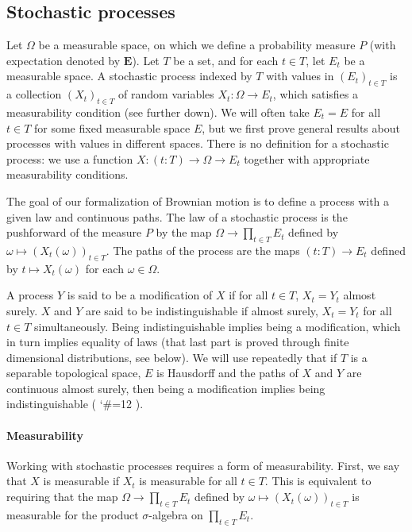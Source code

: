 \documentclass[lean]{Draft}
\makeatletter
\newcommand\leanlink{\begingroup\catcode`\#=12\relax\@leanlink}
\newcommand\@leanlink[2]{\endgroup
\href{#1}
{\texttt{\detokenize{#2}}}}
\newcommand{\bmlink}[3]{%
\leanlink{https://github.com/RemyDegenne/brownian-motion/blob/8fd8dc52830cdd07cf9cc8eadd533e284425fa6f/BrownianMotion/#1.lean\##2}
{#3}}
\makeatother
\begin{document}
\subsection{Stochastic processes}\label{S:stochastic_processes}

Let $\Omega$ be a measurable space, on which we define a probability measure $P$ (with expectation denoted by $\mathbf{E}$).
Let $T$ be a set, and for each $t \in T$, let $E_t$ be a measurable space.
A stochastic process indexed by $T$ with values in $(E_t)_{t \in T}$ is a collection $(X_t)_{t \in T}$ of random variables $X_t : \Omega \to E_t$, which satisfies a measurability condition (see further down).
We will often take $E_t = E$ for all $t \in T$ for some fixed measurable space $E$, but we first prove general results about processes with values in different spaces.
There is no \Lean definition for a stochastic process: we use a function $X : (t : T) \to \Omega \to E_t$ together with appropriate measurability conditions.

The goal of our formalization of Brownian motion is to define a process with a given law and continuous paths.
The law of a stochastic process is the pushforward of the measure $P$ by the map $\Omega \to \prod_{t \in T} E_t$ defined by $\omega \mapsto (X_t(\omega))_{t \in T}$.
The paths of the process are the maps $(t : T) \to E_t$ defined by $t \mapsto X_t(\omega)$ for each $\omega \in \Omega$.%

A process $Y$ is said to be a modification of $X$ if for all $t \in T$, $X_t = Y_t$ almost surely.
$X$ and $Y$ are said to be indistinguishable if almost surely, $X_t = Y_t$ for all $t \in T$ simultaneously.
Being indistinguishable implies being a modification, which in turn implies equality of laws (that last part is proved through finite dimensional distributions, see below).
We will use repeatedly that if $T$ is a separable topological space, $E$ is Hausdorff and the paths of $X$ and $Y$ are continuous almost surely, then being a modification implies being indistinguishable (\bmlink{Gaussian/StochasticProcesses}{L18-L22}{indistinguishable_of_modification}).


\paragraph{Measurability}

Working with stochastic processes requires a form of measurability.
First, we say that $X$ is measurable if $X_t$ is measurable for all $t \in T$.
This is equivalent to requiring that the map $\Omega \to \prod_{t \in T} E_t$ defined by $\omega \mapsto (X_t(\omega))_{t \in T}$ is measurable for the product $\sigma$-algebra on $\prod_{t \in T} E_t$.
\end{document}
